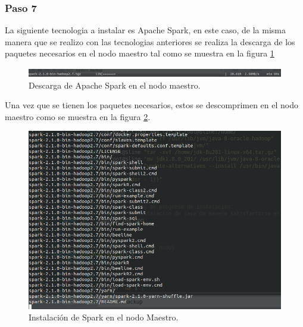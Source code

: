 \subsubsection{Paso 7}
La siguiente tecnologia a instalar es Apache Spark, en este caso, de la misma manera que se realizo con las tecnologias anteriores se realiza la descarga de los paquetes necesarios en el nodo maestro tal como se muestra en la figura \ref{fig:sparkmaestro}
\begin{figure}[H]
	\hypertarget{fig:sparkmaestro}{\hspace{1pt}}
	\begin{center}	
		\includegraphics[width=.8\textwidth]{capitulo5/images/descargasparkmaster.png}
		\caption{Descarga de Apache Spark en el nodo maestro.}
		\label{fig:sparkmaestro}
	\end{center}
\end{figure}
Una vez que se tienen los paquetes necesarios, estos se descomprimen en el nodo maestro como se muestra en la figura \ref{fig:una1}. 
\begin{figure}[H]
	\hypertarget{fig:una1}{\hspace{1pt}}
	\begin{center}	
		\includegraphics[width=.7\textwidth]{capitulo5/images/instalacionsparkmaestro.png}
		\caption{Instalación de Spark en el nodo Maestro.}
		\label{fig:una1}
	\end{center}
\end{figure}
